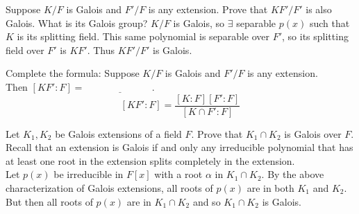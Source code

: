 \documentclass[avery5371,grid]{flashcards}
\newcommand{\blank}{$\; \underline{\hspace{1in}} \; $}
\DeclareMathOperator{\Gal}{Gal}
\begin{document}
\begin{flashcard}[Fields]{Suppose $K/F$ is Galois and $F'/F$ is any extension. Prove that $KF'/F'$ is also Galois. What is its Galois group?}
 $K/F$ is Galois, so $\exists$ separable $p(x)$ such that $K$ is its splitting field. This same polynomial is separable over $F'$, so its splitting field over $F'$ is $KF'$. Thus $KF'/F'$ is Galois. 
\begin{center}
\end{center}
\end{flashcard}

\begin{flashcard}[Fields]{Complete the formula: Suppose $K/F$ is Galois and $F'/F$ is any extension. \\Then $[KF':F] = $ \blank.}
 $$
 [KF':F] = \dfrac{[K:F][F':F]}{[K \cap F' : F]}
 $$
\end{flashcard}

\begin{flashcard}[Fields]{Let $K_1, K_2$ be Galois extensions of a field $F$. Prove that $K_1 \cap K_2$ is Galois over $F$.}
 Recall that an extension is Galois if and only any irreducible polynomial that has at least one root in the extension splits completely in the extension.\\
 
 Let $p(x)$ be irreducible in $F[x]$ with a root $\alpha$ in $K_1 \cap  K_2$. By the above characterization of Galois extensions, all roots of $p(x)$ are in both $K_1$ and $K_2$. But then all roots of $p(x)$ are in $K_1 \cap K_2$ and so $K_1 \cap K_2$ is Galois.
\end{flashcard}
\end{document}
